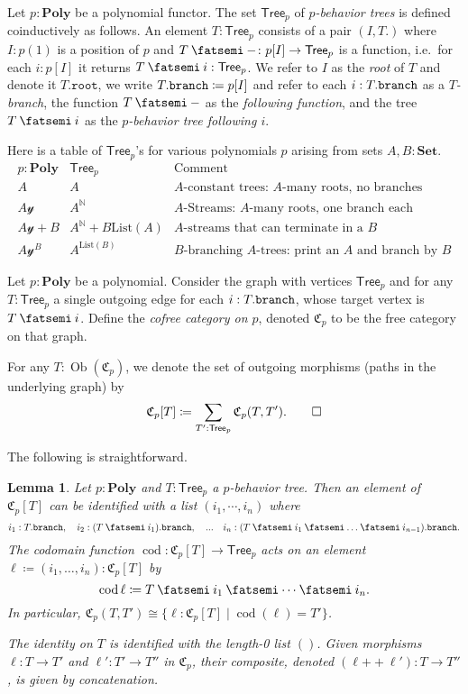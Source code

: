 \documentclass[11pt, one side, article]{memoir}
\theoremstyle{definition}
\theoremstyle{plain}
\newtheorem{lemma}[definitionx]{Lemma}
\newenvironment{example}
  {\pushQED{\qed}\renewcommand{\qedsymbol}{$\lozenge$}\examplex}
  {\popQED\endexamplex}
\newenvironment{definition}
  {\pushQED{\qed}\renewcommand{\qedsymbol}{$\lozenge$}\definitionx}
  {\popQED\enddefinitionx}
\DeclareMathOperator{\cod}{cod}
\DeclareMathOperator{\ob}{Ob}
\newcommand{\Set}[1]{\mathsf{#1}}%
\newcommand{\Cat}[1]{\mathbf{#1}}%
\newcommand{\Fun}[1]{\mathrm{#1}}%
\newcommand{\then}{\mathbin{\fatsemi}}
\newcommand{\tn}[1]{\textnormal{#1}}
\newcommand{\nn}{\mathbb{N}}
\newcommand{\smset}{\Cat{Set}}
\newcommand{\List}{\Fun{List}}
\newcommand{\plpl}{\mathbin{+\!\!+}}
\newcommand{\yon}{\mathcal{y}}
\newcommand{\poly}{\Cat{Poly}}
\newcommand{\Cofree}{\mathfrak{C}}
\newcommand{\tree}{\Set{Tree}}
\newcommand{\rt}{\texttt{root}}
\newcommand{\br}{\tn{\texttt{branch}}}
\begin{document}
\begin{definition}
Let $p:\poly$ be a polynomial functor. The set $\tree_p$ of \emph{$p$-behavior trees} is defined coinductively as follows. An element $T:\tree_p$ consists of a pair $(I,T.)$ where $I:p(1)$ is a position of $p$ and $T\then -\colon p[I]\to\tree_p$ is a function, i.e.\ for each $i:p[I]$ it returns $T\then i:\tree_p$. 
We refer to $I$ as the \emph{root} of $T$ and denote it $T.\rt$, we write $T.\br\coloneqq p[I]$ and refer to each $i:T.\br$ as a \emph{$T$-branch}, the function $T\then-$ as the \emph{following function}, and the tree $T\then i$ as the \emph{$p$-behavior tree following $i$}.
\end{definition}

\begin{example}
Here is a table of $\tree_p$'s for various polynomials $p$ arising from sets $A,B:\smset$.
\[
\begin{array}{l|l|l}
p:\poly&\tree_p&\text{Comment}\\\hline
A&A&\text{$A$-constant trees: $A$-many roots, no branches}\\
A\yon&A^\nn&\text{$A$-Streams: $A$-many roots, one branch each}\\
A\yon+B&A^\nn+B\List(A)&\text{$A$-streams that can terminate in a $B$}\\
A\yon^B&A^{\List(B)}&\text{$B$-branching $A$-trees: print an $A$ and branch by $B$}
\end{array}
\]
\end{example}

\begin{definition}[Cofree category $\Cofree_p$]
Let $p:\poly$ be a polynomial. Consider the graph with vertices $\tree_p$ and for any $T:\tree_p$ a single outgoing edge for each $i:T.\br$, whose target vertex is $T\then i$. Define the \emph{cofree category on $p$}, denoted $\Cofree_p$ to be the free category on that graph.

For any $T:\ob(\Cofree_p)$, we denote the set of outgoing morphisms (paths in the underlying graph) by
\[
\Cofree_p[T]\coloneqq\sum_{T':\tree_p}\Cofree_p(T,T').
\qedhere
\]
\end{definition}

The following is straightforward.
\begin{lemma}
Let $p:\poly$ and $T:\tree_p$ a $p$-behavior tree. Then an element of $\Cofree_p[T]$ can be identified with a list $(i_1,\cdots,i_n)$ where
\[
i_1:T.\br,\quad
i_2:(T\then i_1).\br,\quad...\quad
i_n:(T\then i_1\then\ldots\then i_{n-1}).\br.
\]
The codomain function $\cod\colon\Cofree_p[T]\to\tree_p$ acts on an element $\ell\coloneqq(i_1,\ldots,i_n):\Cofree_p[T]$ by 
\[
\cod\ell\coloneqq T\then i_1\then\cdots\then i_n.
\]
In particular, $\Cofree_p(T,T')\cong\{\ell\colon\Cofree_p[T]\mid\cod(\ell)=T'\}$. 

The identity on $T$ is identified with the length-0 list $()$. Given morphisms $\ell\colon T\to T'$ and $\ell'\colon T'\to T''$ in $\Cofree_p$, their composite, denoted $(\ell\plpl\ell')\colon T\to T''$, is given by concatenation.
\end{lemma}
\end{document}
